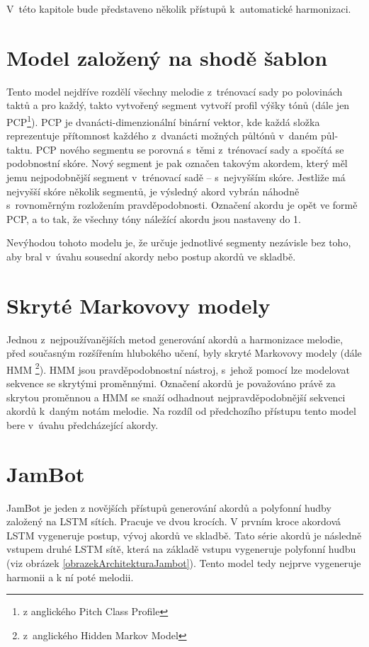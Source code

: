 V~této kapitole bude představeno několik přístupů k~automatické harmonizaci.

\section{Model založený na shodě šablon}
\label{shodaSablon}
Tento model nejdříve rozdělí všechny melodie z~trénovací sady po polovinách taktů 
a pro každý, takto vytvořený segment vytvoří profil výšky tónů 
(dále jen PCP\footnote{z anglického Pitch Class Profile}).
\cite{YinCheng_comparativeStudy}
PCP je dvanácti-dimenzionální binární vektor, 
kde každá složka reprezentuje přítomnost 
každého z~dvanácti možných půltónů v~daném půl-taktu.
\cite{fujishima}
PCP nového segmentu se porovná s~těmi z~trénovací sady
a spočítá se podobnostní skóre.
Nový segment je pak označen takovým akordem,
který měl jemu nejpodobnější segment v~trénovací sadě -- s~nejvyšším skóre.
Jestliže má nejvyšší skóre několik segmentů,
je výsledný akord vybrán náhodně s~rovnoměrným rozložením pravděpodobnosti.
Označení akordu je opět ve formě PCP, a to tak,
že všechny tóny náležící akordu jsou nastaveny do 1.
\par

Nevýhodou tohoto modelu je, že určuje jednotlivé segmenty nezávisle bez toho,
aby bral v~úvahu sousední akordy nebo postup akordů ve skladbě.
\cite{YinCheng_comparativeStudy}

\section{Skryté Markovovy modely}
Jednou z~nejpoužívanějších metod generování akordů a harmonizace melodie, 
před současným rozšířením hlubokého učení, byly skryté Markovovy modely 
(dále HMM \footnote{z~anglického Hidden Markov Model}).
HMM jsou pravděpodobnostní nástroj, 
s~jehož pomocí lze modelovat sekvence se skrytými proměnnými.
Označení akordů je považováno právě za skrytou proměnnou a 
HMM se snaží odhadnout nejpravděpodobnější sekvenci akordů
k~daným notám melodie.
Na rozdíl od předchozího přístupu 
tento model bere v~úvahu předcházející akordy.
\cite{YinCheng_comparativeStudy}

\section{JamBot}
\label{Jambot}
JamBot je jeden z novějších přístupů generování akordů 
a polyfonní hudby založený na LSTM sítích.
Pracuje ve dvou krocích.
V prvním kroce akordová LSTM vygeneruje postup, vývoj akordů ve skladbě.
Tato série akordů je následně vstupem druhé LSTM sítě,
která na základě vstupu vygeneruje polyfonní hudbu (viz obrázek \ref{obrazekArchitekturaJambot}).
Tento model tedy nejprve vygeneruje harmonii a k ní poté melodii.
\par


